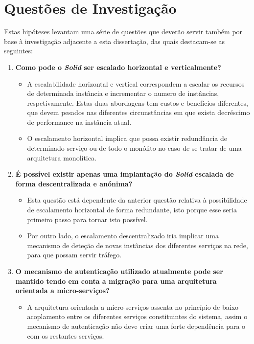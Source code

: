 \section{Questões de Investigação \label{section_investigation_questions}}
Estas hipóteses levantam uma série de questões que deverão servir também por base à investigação adjacente a esta dissertação, das quais destacam-se as seguintes:
\begin{enumerate}
    \item \textbf{Como pode o \emph{Solid} ser escalado horizontal e verticalmente?}
    \begin{itemize}
        \item A escalabilidade horizontal e vertical correspondem a escalar os recursos de determinada instância e incrementar o numero de instâncias, respetivamente. Estas duas abordagens tem custos e benefícios diferentes, que devem pesados nas diferentes circunstâncias em que exista decréscimo de performance na instância atual.
        \item O escalamento horizontal implica que possa existir redundância de determinado serviço ou de todo o monólito no caso de se tratar de uma arquitetura monolítica.
    \end{itemize}
    \item \textbf{É possível existir apenas uma implantação do \emph{Solid} escalada de forma descentralizada e anónima?}
    \begin{itemize}
        \item Esta questão está dependente da anterior questão relativa à possibilidade de escalamento horizontal de forma redundante, isto porque esse seria primeiro passo para tornar isto possível.
        \item Por outro lado, o escalamento descentralizado iria implicar uma mecanismo de deteção de novas instâncias dos diferentes serviços na rede, para que possam servir tráfego.
    \end{itemize}
    \item \textbf{O mecanismo de autenticação utilizado atualmente pode ser mantido tendo em conta a migração para uma arquitetura orientada a micro-serviços?}
    \begin{itemize}
        \item A arquitetura orientada a micro-serviços assenta no princípio de baixo acoplamento entre os diferentes serviços constituintes do sistema, assim o mecanismo de autenticação não deve criar uma forte dependência para o com os restantes serviços\cite{building_microservices:2015}.
    \end{itemize}
\end{enumerate}

